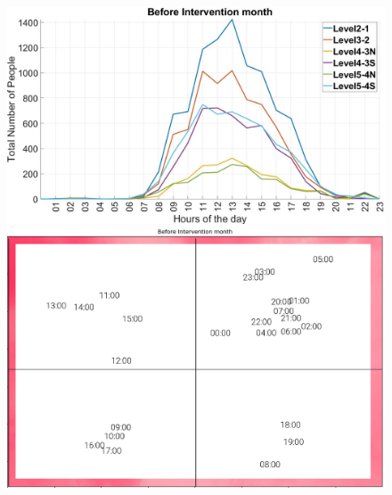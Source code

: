 

\begin{figure}[htb]
\centering
    \begin{minipage}[b]{0.5\textwidth}
    \includegraphics[width=\textwidth]{image/Chapters/Chapter6/before_int.jpg}%
    \end{minipage}
    \begin{minipage}[b]{0.39\textwidth}
    \includegraphics[width=\textwidth]{image/Chapters/Chapter6/timeseriesBefore.png}
    \end{minipage}
    

\end{figure}
